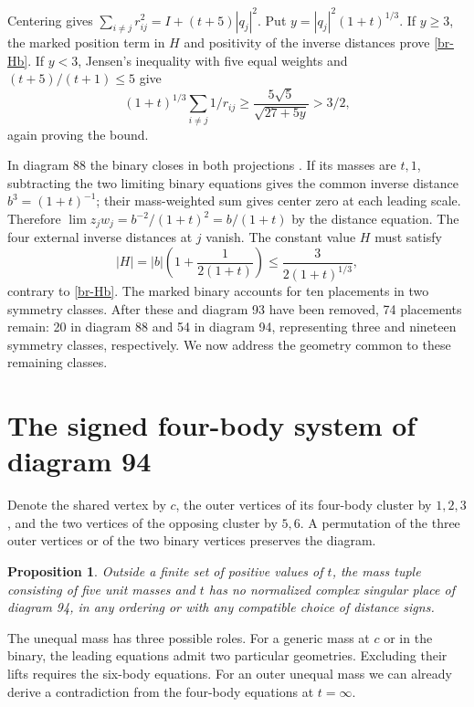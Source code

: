 \documentclass[11pt,letterpaper]{article}
\newtheorem{proposition}[theorem]{Proposition}
\theoremstyle{definition}
\begin{document}
Centering gives $\sum_{i\ne j}r_{ij}^2=I+(t+5)|q_j|^2$.
Put $y=|q_j|^2(1+t)^{1/3}$. If $y\ge3$, the marked position term
in $H$ and positivity of the inverse distances prove \eqref{br-Hb}.
If $y<3$, Jensen's inequality with five equal weights and
$(t+5)/(t+1)\le5$ give
\[
 (1+t)^{1/3}\sum_{i\ne j}1/r_{ij}
 \ge\frac{5\sqrt5}{\sqrt{27+5y}}>3/2 ,
\]
again proving the bound.

In diagram 88 the binary closes in both projections
\cite[Lemma 6.16(a) and its proof]{Tomar}. If its masses are $t,1$,
subtracting the two limiting binary equations gives the common
inverse distance $b^3=(1+t)^{-1}$; their mass-weighted sum gives
center zero at each leading scale. Therefore
$\lim z_jw_j=b^{-2}/(1+t)^2=b/(1+t)$ by the distance equation.
The four external inverse distances at $j$ vanish. The constant
value $H$ must satisfy
\[
 |H|=|b|\left(1+\frac1{2(1+t)}\right)
 \le\frac{3}{2(1+t)^{1/3}},
\]
contrary to \eqref{br-Hb}. The marked binary accounts for ten
placements in two symmetry classes. After these and diagram 93
have been removed, 74 placements remain: 20 in diagram 88 and
54 in diagram 94, representing three and nineteen symmetry classes,
respectively. We now address the geometry common to these remaining
classes.
\section{The signed four-body system of diagram 94}\label{nf:signed}

Denote the shared vertex by $c$, the outer vertices of its four-body cluster by
$1,2,3$, and the two vertices of the opposing cluster by $5,6$.
A permutation of the three outer vertices or of the two binary vertices preserves
the diagram. \begin{proposition}\label{nf:prop}
Outside a finite set of positive values of $t$, the mass tuple consisting of
five unit masses and $t$ has no normalized complex singular place of diagram
94, in any ordering or with any compatible choice of distance signs.
\end{proposition}
The unequal mass has three possible roles. For a generic mass at
$c$ or in the binary, the leading equations admit two particular geometries. Excluding their lifts requires the six-body equations. For an outer unequal
mass we can already derive a contradiction from the four-body equations at
$t=\infty$.
\end{document}
